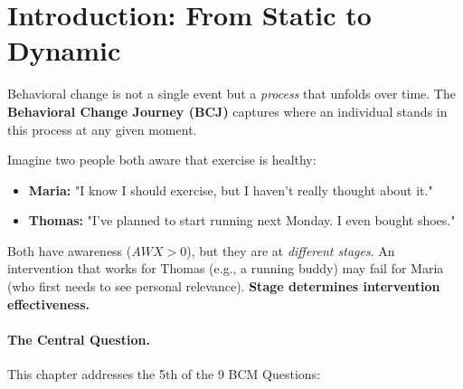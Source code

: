 
\section{Introduction: From Static to Dynamic}
\label{sec:bcj-intro}


Behavioral change is not a single event but a \textit{process} that unfolds over time.
The \textbf{Behavioral Change Journey (BCJ)} captures where an individual stands in
this process at any given moment.

\begin{intuition}
Imagine two people both aware that exercise is healthy:
\begin{itemize}
    \item \textbf{Maria:} "I know I should exercise, but I haven't really thought about it."
    \item \textbf{Thomas:} "I've planned to start running next Monday. I even bought shoes."
\end{itemize}
Both have awareness ($AWX > 0$), but they are at \textit{different stages}.
An intervention that works for Thomas (e.g., a running buddy) may fail for Maria
(who first needs to see personal relevance). \textbf{Stage determines intervention effectiveness.}
\end{intuition}

\paragraph{The Central Question.}
This chapter addresses the 5th of the 9 BCM Questions:

\begin{center}
\end{center}

